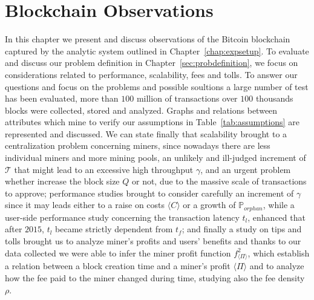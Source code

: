 \documentclass[USenglish]{uit-thesis}
\begin{document}
\chapter{Blockchain Observations}
\label{chap:evaluation}
In this chapter we present and discuss observations of the
Bitcoin blockchain captured by the
analytic system outlined in Chapter~\ref{chap:expsetup}. 
To evaluate and discuss our problem definition in Chapter~\ref{sec:probdefinition},
we focus on considerations related to performance,
scalability, fees and tolls.
To answer our questions and focus on the problems and possible soultions
a large number of test has been evaluated, more than $100$ million
of transactions over $100$ thousands blocks were collected, stored
and analyzed. Graphs and relations between attributes which mine to
verify our assumptions in Table~\ref{tab:assumptions}
are represented and discussed. We can state finally that
scalability brought to a centralization problem concerning miners,
since nowadays there are less individual miners and more mining pools,
an unlikely and ill-judged increment of $\mathcal{T}$
that might lead to an excessive high throughput $\gamma$,
and an urgent problem whether increase the block size $Q$ or not,
due to the massive scale of transactions to approve;
performance studies brought to consider carefully
an increment of $\gamma$ since it may
leads either to a raise on costs $\langle C \rangle$
or a growth of $\mathbb{P}_{orphan}$, while a user-side
performance study concerning the transaction latency $t_l$,
enhanced that after $2015$, $t_l$ became strictly
dependent from $t_f$; and finally a study on
tips and tolls brought us to analyze miner's profits
and users' benefits and thanks to our data collected
we were able to infer the miner profit function
$f_{\langle \Pi \rangle}^2$, which establish a relation
between a block creation time and a miner's profit
$\langle \Pi \rangle$ and to analyze how the
fee paid to the miner changed during time, studying
also the fee density $\rho$.


\end{document}
